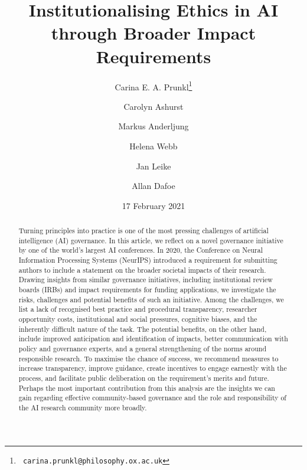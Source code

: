 \documentclass[11pt,english]{article}
\begin{document}
\title{Institutionalising Ethics in AI through Broader Impact Requirements}
\author[1,2]{Carina E. A. Prunkl\thanks{\texttt{
carina.prunkl@philosophy.ox.ac.uk}}
} 
\author[2]{Carolyn Ashurst}
\author[2]{Markus Anderljung}
\author[3]{Helena Webb}
\author[2]{Jan Leike}
\author[2]{Allan Dafoe}

\date{17 February 2021}
\maketitle
{\small \begin{abstract}
Turning principles into practice is one of the most pressing challenges of artificial intelligence (AI) governance. In this article, we reflect on a novel governance initiative by one of the world's largest AI conferences. In 2020, the Conference on Neural Information Processing Systems (NeurIPS) introduced a requirement for submitting authors to include a statement on the broader societal impacts of their research. Drawing insights from similar governance initiatives, including institutional review boards (IRBs) and impact requirements for funding applications, we investigate the risks, challenges and potential benefits of such an initiative. Among the challenges, we list a lack of recognised best practice and procedural transparency, researcher opportunity costs, institutional and social pressures, cognitive biases, and the inherently difficult nature of the task. The potential benefits, on the other hand, include improved anticipation and identification of impacts, better communication with policy and governance experts, and a general strengthening of the norms around responsible research. To maximise the chance of success, we recommend measures to increase transparency, improve guidance, create incentives to engage earnestly with the process, and facilitate public deliberation on the requirement's merits and future. Perhaps the most important contribution from this analysis are the insights we can gain regarding effective community-based governance and the role and responsibility of the AI research community more broadly.
\end{abstract}}
\end{document}
